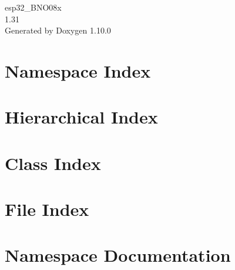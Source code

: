 \documentclass[twoside]{book}
\newcommand{\+}{\discretionary{\mbox{\scriptsize$\hookleftarrow$}}{}{}}
\newcommand{\clearemptydoublepage}{%
    \newpage{\pagestyle{empty}\cleardoublepage}%
  }
\begin{document}
  \raggedbottom
    \hypersetup{pageanchor=false,
                bookmarksnumbered=true,
                pdfencoding=unicode
               }
  \begin{titlepage}
  \vspace*{7cm}
  \begin{center}%
  {\Large esp32\+\_\+\+BNO08x}\\
  [1ex]\large 1.\+31 \\
  \vspace*{1cm}
  {\large Generated by Doxygen 1.10.0}\\
  \end{center}
  \end{titlepage}
  \clearemptydoublepage
  \tableofcontents
  \clearemptydoublepage
  \hypersetup{pageanchor=true}

\chapter{Namespace Index}

\chapter{Hierarchical Index}

\chapter{Class Index}

\chapter{File Index}

\chapter{Namespace Documentation}

\end{document}
